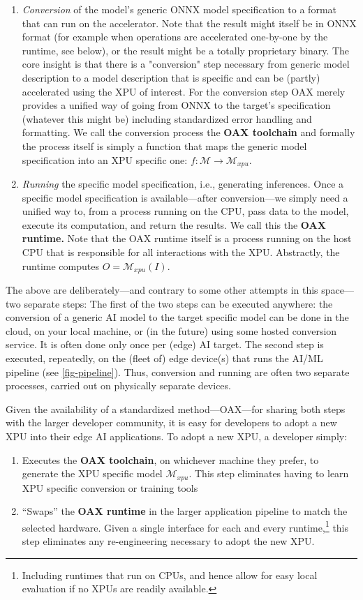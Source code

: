 \documentclass{article}
\begin{document}
\begin{enumerate}
\item \emph{Conversion} of the model's generic ONNX model specification to a format that can run on the accelerator. Note that the result might itself be in ONNX format (for example when operations are accelerated one-by-one by the runtime, see below), or the result might be a totally proprietary binary. The core insight is that there is a "conversion" step necessary from generic model description to a model description that is specific and can be (partly) accelerated using the XPU of interest. For the conversion step OAX merely provides a unified way of going from ONNX to the target's specification (whatever this might be) including standardized error handling and formatting. We call the conversion process the \textbf{OAX toolchain} and formally the process itself is simply a function that maps the generic model specification into an XPU specific one: $f \colon \mathcal{M} \to \mathcal{M}_{xpu}$. 
\item \emph{Running} the specific model specification, i.e., generating inferences. Once a specific model specification is available---after conversion---we simply need a unified way to, from a process running on the CPU, pass data to the model, execute its computation, and return the results. We call this the \textbf{OAX runtime.} Note that the OAX runtime itself is a process running on the host CPU that is responsible for all interactions with the XPU. Abstractly, the runtime computes $O = \mathcal{M}_{xpu}(I)$.
\end{enumerate}

The above are deliberately---and contrary to some other attempts in this space---two separate steps: The first of the two steps can be executed anywhere: the conversion of a generic AI model to the target specific model can be done in the cloud, on your local machine, or (in the future) using some hosted conversion service. It is often done only once per (edge) AI target. The second step is executed, repeatedly, on the (fleet of) edge device(s) that runs the AI/ML pipeline (see \ref{fig-pipeline}). Thus, conversion and running are often two separate processes, carried out on physically separate devices.

Given the availability of a standardized method---OAX---for sharing both steps with the larger developer community, it is easy for developers to adopt a new XPU into their edge AI applications. To adopt a new XPU, a developer simply:
\begin{enumerate}
\item Executes the \textbf{OAX toolchain}, on whichever machine they prefer, to generate the XPU specific model $\mathcal{M}_{xpu}$. This step eliminates having to learn XPU specific conversion or training tools
\item ``Swaps'' the \textbf{OAX runtime} in the larger application pipeline to match the selected hardware. Given a single interface for each and every runtime,\footnote{Including runtimes that run on CPUs, and hence allow for easy local evaluation if no XPUs are readily available.} this step eliminates any re-engineering necessary to adopt the new XPU.
\end{enumerate}
\end{document}
